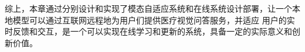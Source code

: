 综上，本章通过分别设计和实现了模态自适应系统和在线系统设计部署，让一个本地模型可以通过互联网远程地为用户们提供医疗视觉问答服务，并适应
用户的实时反馈和交互，是一个可以实现在线学习和更新的系统，具备一定的实际意义和创新价值。













